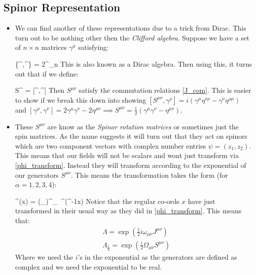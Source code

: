 \documentclass[11pt]{article}
\renewenvironment{flalign}{\vspace{-2mm}\empheq[box=\tcbhighmath]{align}}{\endempheq}
\numberwithin{equation}{section}
\begin{document}
\subsection{Spinor Representation}
\begin{itemize}
  \item We can find another of these representations due to a trick from Dirac. This turn out to be nothing other then the \emph{Clifford algebra}. Suppose  we have a set of $n\times n$ matrices $\gamma^{\mu}$ satisfying: 

  \begin{flalign}
  \label{gamma_def}
    \{\gamma^{\mu},\gamma^{\nu}\} = 2\eta^{\mu\nu}_{n}
  \end{flalign}
  This is also known as a Dirac algebra. Then using this, it turns out that if we define: 

  \begin{flalign}
  \label{S_def}
    S^{\mu\nu} = [\gamma^{\mu},\gamma^{\nu}]
  \end{flalign}
  Then $S^{\mu\nu}$ satisfy the commutation relations \ref{J_com}.  This is easier to show if we break this down into showing $[S^{\mu\nu},\gamma^{\rho}] = i(\gamma^{\mu}\eta^{\nu\rho}-\gamma^{\nu}\eta^{\rho\mu})$ and $[\gamma^{\mu},\gamma^{\nu}] = 2\gamma^{\mu}\gamma^{\nu}-2\eta^{\mu\nu} \implies S^{\mu\nu} = \frac{i}{2}(\gamma^{\mu}\gamma^{\nu}-\eta^{\mu\nu})$. 

  \item These $S^{\mu\nu}$ are know as the \emph{Spinor rotation matrices} or sometimes just the spin matrices. As the name suggests it will turn out that they act on spinors which are two component vectors with complex number entries $\psi = (z_{1},z_2)$. This means that our fields will not be scalars and wont just transform via \ref{phi_transform}. Instead they will transform according to the exponential of our generators $S^{\mu\nu}$. This means the transformation takes the form (for $\alpha=1,2,3,4$):

  \begin{flalign}
    \label{S_transform}
    \psi^{\alpha}(x) = (\Lambda_{})^{\alpha}_{~\beta}\psi^{\beta}(\Lambda^{-1}x)
  \end{flalign}
  Notice that the regular co-ords $x$ have just transformed in their usual way as they did in \ref{phi_transform}. This means that:
  \begin{align}
     &\Lambda = \exp(\frac{1}{2}i\omega_{\mu\nu}J^{\mu\nu}) \nonumber \\
     \label{L_half}
     & \Lambda_{\frac{1}{2}} = \exp(\frac{i}{2}\Omega_{\mu\nu}S^{\mu\nu})
   \end{align} 
   Where we need the $i$'s in the exponential as the generators are defined as complex and we need the exponential to be real. 
\end{itemize}
\end{document}
